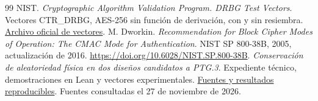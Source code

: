 \documentclass[11pt,a4paper]{article}
\begin{document}
\begin{thebibliography}{99}
 NIST. \emph{Cryptographic Algorithm Validation Program. DRBG Test Vectors}. Vectores CTR\_DRBG, AES-256 sin función de derivación, con y sin resiembra. \href{https://csrc.nist.gov/CSRC/media/Projects/Cryptographic-Algorithm-Validation-Program/documents/drbg/drbgtestvectors.zip}{Archivo oficial de vectores}.
 M. Dworkin. \emph{Recommendation for Block Cipher Modes of Operation: The CMAC Mode for Authentication}. NIST SP 800-38B, 2005, actualización de 2016. \url{https://doi.org/10.6028/NIST.SP.800-38B}.
 \emph{Conservación de aleatoriedad física en dos diseños candidatos a PTG.3}. Expediente técnico, demostraciones en Lean y vectores experimentales. \href{https://github.com/jordiprga/technical-work/tree/2804a8b2bee6c6a5ac2a007d46a3eee56ecd7ecb/operation-token-burn-2026-11-14/00_coordination/ptg3-its}{Fuentes y resultados reproducibles}. Fuentes consultadas el 27 de noviembre de 2026.
\end{thebibliography}
\end{document}
